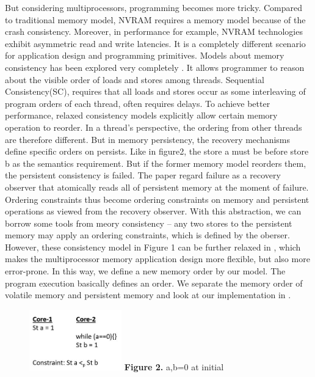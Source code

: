\documentclass{sig-alternate}
\begin{document}
	But considering multiprocessors, programming becomes more tricky. Compared to traditional memory model, NVRAM requires a memory model because of the crash consistency. Moreover, in performance for example, NVRAM technologies exhibit asymmetric read and write latencies. It is a completely different scenario for application design and programming primitives. Models about memory consistency has been explored very completely \cite{546611}. It allows programmer to reason about the visible order of loads and stores among threads. Sequential Consistency(SC), requires that all loads and stores occur as some interleaving of program orders of each thread, often requires delays.
	To achieve better performance, relaxed consistency models explicitly allow certain memory operation to reorder. In a thread's perspective, the ordering from other threads are therefore different. But in memory persistency, the recovery mechanisms define specific orders on persists. Like in figure2, the store a must be before store b as the semantics requirement. But if the former memory model reorders them, the persistent consistency is failed. The paper \cite{Pelley:2014:MP:2665671.2665712} regard failure as a recovery observer that atomically reads all of persistent memory at the moment of failure. Ordering constraints thus become ordering constraints on memory and persistent operations as viewed from the recovery observer. With this abstraction, we can borrow some tools from meory consistency -- any two stores to the persistent memory may apply an ordering constraints, which is defined by the oberser. However, these consistency model in Figure 1 can be further relaxed in \cite{Kolli:2016:HTP:2954679.2872381}, which makes the multiprocessor memory application design more flexible, but also more error-prone. 
	In this way, we define a new memory order by our model. The program execution basically defines an order. We separate the memory order of volatile memory and persistent memory and look at our implementation in \cite{Pelley:2014:MP:2665671.2665712}. 

\begin{figure}[b]
\includegraphics[width=4cm]{mt2}
\textbf{Figure 2.} a,b=0 at initial 
\end{figure}
\end{document}
